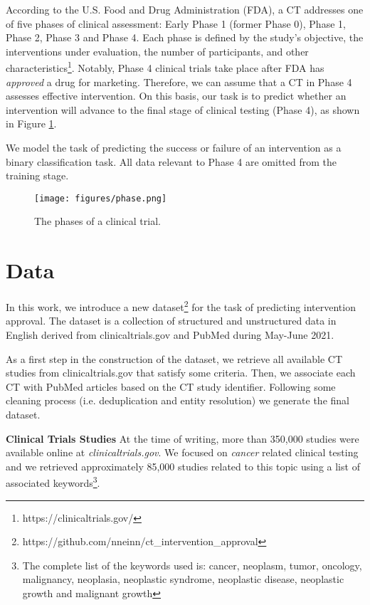 \documentclass[11pt]{article}
\begin{document}
According to the U.S. Food and Drug Administration (FDA), a CT addresses one of five phases of clinical assessment: Early Phase 1 (former Phase 0), Phase 1, Phase 2, Phase 3 and Phase 4. Each phase is defined by the study's objective, the interventions under evaluation, the number of participants, and other characteristics\footnote{https://clinicaltrials.gov/}. Notably, Phase 4 clinical trials take place after FDA has \emph{approved} a drug for marketing. Therefore, we can assume that a CT in Phase 4 assesses effective intervention. On this basis, our task is to predict whether an intervention will advance to the final stage of clinical testing (Phase 4), as shown in Figure \ref{fig:ct_phases}. 

We model the task of predicting the success or failure of an intervention as a binary classification task. 
All data relevant to Phase 4 are omitted from the training stage. 

\begin{figure}[htp]
\begin{center}
\texttt{[image: figures/phase.png]}
\caption{The phases of a clinical trial.}
\label{fig:ct_phases}
\end{center}
\end{figure}


\section{Data}
In this work, we introduce a new dataset\footnote{https://github.com/nneinn/ct\_intervention\_approval} for the task of predicting intervention approval. The dataset is a collection of structured and unstructured data in English derived from clinicaltrials.gov and PubMed during May-June 2021.


As a first step in the construction of the dataset, we retrieve all available CT studies from clinicaltrials.gov that satisfy some criteria. Then, we associate each CT with PubMed articles based on the CT study identifier. Following some cleaning process (i.e. deduplication and entity resolution) we generate the final dataset.


\textbf{Clinical Trials Studies}
At the time of writing, more than 350,000 studies were available online at \emph{clinicaltrials.gov}.  We focused on \emph{cancer} related clinical testing and we retrieved approximately 85,000 studies related to this topic using a list of associated keywords\footnote{The complete list of the keywords used is: cancer, neoplasm, tumor, oncology, malignancy, neoplasia, neoplastic syndrome, neoplastic disease,	neoplastic growth and malignant growth}. 
\end{document}
